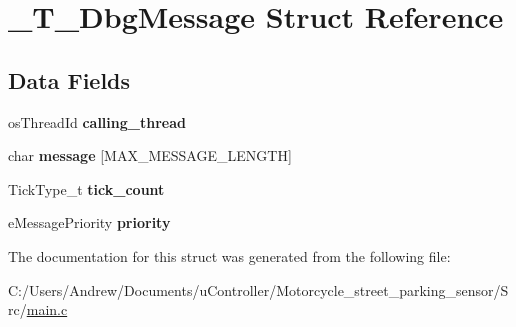 \hypertarget{struct___t___dbg_message}{}\section{\+\_\+\+T\+\_\+\+Dbg\+Message Struct Reference}
\label{struct___t___dbg_message}
\subsection*{Data Fields}
\begin{DoxyCompactItemize}
\item 
\mbox{\label{struct___t___dbg_message_a8131a46c95da2b68459fb0cca59db547}} 
os\+Thread\+Id {\bfseries calling\+\_\+thread}
\item 
\mbox{\label{struct___t___dbg_message_a583b94f2f8354ad3ff5e982a531ab508}} 
char {\bfseries message} \mbox{[}M\+A\+X\+\_\+\+M\+E\+S\+S\+A\+G\+E\+\_\+\+L\+E\+N\+G\+TH\mbox{]}
\item 
\mbox{\label{struct___t___dbg_message_a297a663f086dea0b73b566abcf400751}} 
Tick\+Type\+\_\+t {\bfseries tick\+\_\+count}
\item 
\mbox{\label{struct___t___dbg_message_ad9fcb4a6bda1da78b6b1699f6b340d6f}} 
e\+Message\+Priority {\bfseries priority}
\end{DoxyCompactItemize}


The documentation for this struct was generated from the following file\+:\begin{DoxyCompactItemize}
\item 
C\+:/\+Users/\+Andrew/\+Documents/u\+Controller/\+Motorcycle\+\_\+street\+\_\+parking\+\_\+sensor/\+Src/\mbox{\hyperlink{main_8c}{main.\+c}}\end{DoxyCompactItemize}
